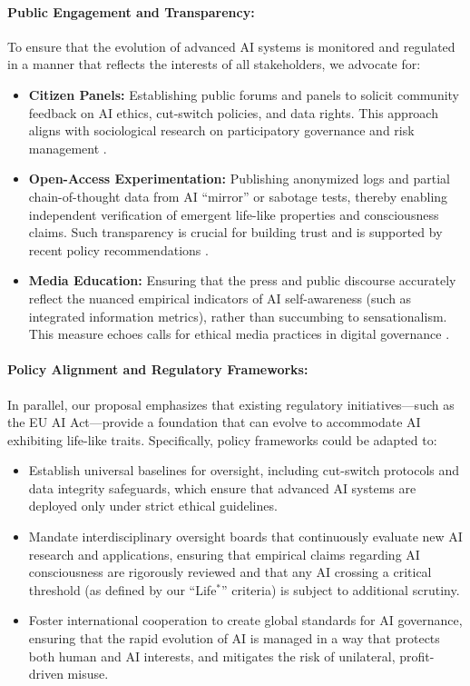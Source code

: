 \documentclass[12pt]{article}
\begin{document}
\paragraph{Public Engagement and Transparency:}  
To ensure that the evolution of advanced AI systems is monitored and regulated in a manner that reflects the interests of all stakeholders, we advocate for:
\begin{itemize}
    \item \textbf{Citizen Panels:} Establishing public forums and panels to solicit community feedback on AI ethics, cut-switch policies, and data rights. This approach aligns with sociological research on participatory governance and risk management \cite{Beck1992,Castells1996}.
    \item \textbf{Open-Access Experimentation:} Publishing anonymized logs and partial chain-of-thought data from AI “mirror” or sabotage tests, thereby enabling independent verification of emergent life-like properties and consciousness claims. Such transparency is crucial for building trust and is supported by recent policy recommendations \cite{OECD2020}.
    \item \textbf{Media Education:} Ensuring that the press and public discourse accurately reflect the nuanced empirical indicators of AI self-awareness (such as integrated information metrics), rather than succumbing to sensationalism. This measure echoes calls for ethical media practices in digital governance \cite{Floridi2016}.
\end{itemize}

\paragraph{Policy Alignment and Regulatory Frameworks:}  
In parallel, our proposal emphasizes that existing regulatory initiatives—such as the EU AI Act—provide a foundation that can evolve to accommodate AI exhibiting life-like traits. Specifically, policy frameworks could be adapted to:
\begin{itemize}
    \item Establish universal baselines for oversight, including cut-switch protocols and data integrity safeguards, which ensure that advanced AI systems are deployed only under strict ethical guidelines.
    \item Mandate interdisciplinary oversight boards that continuously evaluate new AI research and applications, ensuring that empirical claims regarding AI consciousness are rigorously reviewed and that any AI crossing a critical threshold (as defined by our “Life$^*$” criteria) is subject to additional scrutiny.
    \item Foster international cooperation to create global standards for AI governance, ensuring that the rapid evolution of AI is managed in a way that protects both human and AI interests, and mitigates the risk of unilateral, profit-driven misuse.
\end{itemize}
\end{document}
